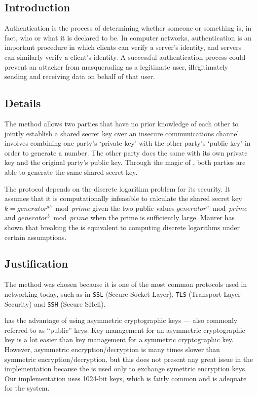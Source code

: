 \documentclass[a4paper,11pt]{article}
\begin{document}
\subsection{Introduction}
Authentication is the process of determining whether someone or something is, in
fact, who or what it is declared to be. In computer networks, authentication is 
an important procedure in which clients can verify a server's identity, and 
servers can similarly verify a client's identity. A successful authentication 
process could prevent an attacker from masquerading as a legitimate user,
illegitimately sending and receiving data on behalf of that user.

\subsection{Details}
The  method allows two parties that have 
no prior knowledge of each other to jointly establish a shared secret key over 
an insecure communications channel.  
involves combining one party's `private key' with the other party's `public key'
in order to generate a number. The other party does the same with its own 
private key and the original party's public key. Through the magic of 
, both parties are able to generate the same shared 
secret key.

The protocol depends on the discrete logarithm problem for its security. It 
assumes that it is computationally infeasible to calculate the shared secret key
$k = generator^{ab} \bmod prime$ given the two public values 
$generator^{a} \bmod prime$ and $generator^{b} \bmod prime$ when the prime is 
sufficiently large. Maurer has shown that breaking the 
 is equivalent to computing discrete 
logarithms under certain assumptions.

\subsection{Justification}
The  method was chosen because it is one
of the most common protocols used in networking today, such as in \verb+SSL+ 
(Secure Socket Layer), \verb+TLS+ (Transport Layer Security) and \verb+SSH+
(Secure SHell).

 has the advantage of using asymmetric cryptographic 
keys --- also commonly referred to as ``public'' keys. Key management for an
asymmetric cryptographic key is a lot easier than key management for a
symmetric cryptographic key. However, asymmetric encryption/decryption is many 
times slower than symmetric encryption/decryption, but this does not present any 
great issue in the \packageName{} implementation because the 
 is used only to exchange symettric
encryption keys. Our  implementation uses 1024-bit 
keys, which is fairly common and is adequate for the \serviceName{} system.
\end{document}
